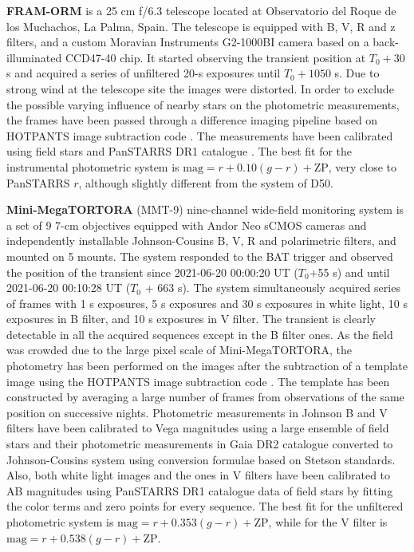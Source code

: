 \documentclass{naturesubmissionstyle}
\begin{document}
{\bf FRAM-ORM} \cite{fram_la_palma} is a 25 cm f/6.3 telescope located at Observatorio del Roque de los Muchachos, La Palma, Spain. The telescope is equipped with B, V, R and z filters, and a custom Moravian Instruments G2-1000BI camera based on a back-illuminated CCD47-40 chip. It started observing the transient position at $T_0+30$ s and acquired a series of unfiltered 20-s exposures until $T_0+1050$ s. Due to strong wind at the telescope site the images were distorted. In order to exclude the possible varying influence of nearby stars on the photometric measurements, the frames have been passed through a difference imaging pipeline based on HOTPANTS image subtraction code \cite{hotpants}. The measurements have been calibrated using field stars and PanSTARRS DR1 catalogue \cite{ps1}. The best fit for the instrumental photometric system is $\mbox{mag} = r + 0.10(g - r) + \mbox{ZP}$, very close to PanSTARRS $r$, although slightly different from the system of D50.

{\bf Mini-MegaTORTORA} (MMT-9) nine-channel wide-field monitoring system \cite{beskin_mmt_2017} is a set of 9 7-cm objectives equipped with Andor Neo sCMOS cameras and independently installable Johnson-Cousins B, V, R and polarimetric filters, and mounted on 5 mounts. The system responded to the BAT trigger and observed the position
of the transient since 2021-06-20 00:00:20 UT
($T_0$+55 s) and until 2021-06-20
00:10:28 UT ($T_0$ + 663 s). The system simultaneously acquired series of
frames with 1 s exposures, 5 s exposures and 30 s exposures in white light,
10 s exposures in B filter, and 10 s exposures in V filter. 
The transient is clearly detectable in all the acquired sequences except in the B filter ones. As the field was crowded due to the large pixel scale of Mini-MegaTORTORA, the photometry has been performed on 
the images after the subtraction of a template image using the HOTPANTS image subtraction code \cite{hotpants}. The template has been constructed by averaging a large number of frames from observations of the same position on successive nights.
Photometric measurements in Johnson B and V filters have been calibrated to Vega magnitudes using a large ensemble of field stars and their photometric measurements in Gaia DR2 catalogue %
converted to Johnson-Cousins system using conversion formulae based on Stetson standards.
Also, both white light images and the ones in V filters have been calibrated to AB magnitudes using PanSTARRS DR1 catalogue \cite{ps1} data of field stars by fitting the color terms and zero points for every sequence. The best fit for the unfiltered photometric system is $\mbox{mag} = r + 0.353(g - r) + \mbox{ZP}$, while for the V filter %
is $\mbox{mag} = r + 0.538(g - r) + \mbox{ZP}$. 
\end{document}
